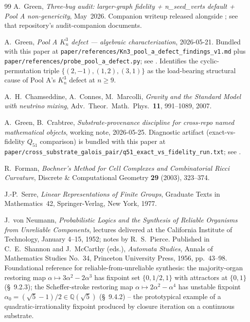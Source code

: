 \documentclass[12pt,a4paper]{article}
\theoremstyle{definition}
\theoremstyle{remark}
\newcommand{\bQ}{\mathbb{Q}}                %
\begin{document}
\begin{thebibliography}{99}
 A.~Green,
\emph{Three-bug audit: larger-graph fidelity + n\_seed\_verts default
+ Pool A non-genericity}, May~2026.
Companion writeup released alongside \cite{CFS2026}; see that
repository's audit-companion documents.

 A.~Green,
\emph{Pool A $K_n^3$ defect --- algebraic characterization},
2026-05-21.
Bundled with this paper at
\texttt{paper/references/Kn3\_pool\_a\_defect\_findings\_v1.md}
plus
\texttt{paper/references/probe\_pool\_a\_defect.py};
see \cite{paper-source}.
Identifies the cyclic-permutation triple
$\{(2,-1), (1,2), (3,1)\}$ as the load-bearing structural cause of
Pool A's $K_n^3$ defect at $n \ge 9$.

 A.~H.~Chamseddine, A.~Connes, M.~Marcolli,
\emph{Gravity and the Standard Model with neutrino mixing},
Adv.\ Theor.\ Math.\ Phys.\ \textbf{11}, 991--1089, 2007.

 A.~Green, B.~Crabtree,
\emph{Substrate-provenance discipline for cross-repo named
mathematical objects}, working note, 2026-05-25.
Diagnostic artifact (exact-vs-fidelity $Q_{51}$ comparison) is
bundled with this paper at
\texttt{paper/cross\_substrate\_galois\_pair/q51\_exact\_vs\_fidelity\_run.txt};
see \cite{paper-source}.

 R.~Forman,
\emph{Bochner's Method for Cell Complexes and Combinatorial Ricci
Curvature}, Discrete \& Computational Geometry \textbf{29} (2003),
323--374.

 J.-P.~Serre,
\emph{Linear Representations of Finite Groups}, Graduate Texts in
Mathematics~42, Springer-Verlag, New York, 1977.

 J.~von Neumann,
\emph{Probabilistic Logics and the Synthesis of Reliable Organisms
from Unreliable Components}, lectures delivered at the California
Institute of Technology, January 4--15, 1952; notes by R.~S.~Pierce.
Published in C.~E.~Shannon and J.~McCarthy (eds.),
\emph{Automata Studies}, Annals of Mathematics Studies No.~34,
Princeton University Press, 1956, pp.~43--98.
Foundational reference for reliable-from-unreliable synthesis: the
majority-organ restoring map $\alpha\mapsto 3\alpha^2-2\alpha^3$ has
fixpoint set $\{0,1/2,1\}$ with attractors at $\{0,1\}$ (\S~9.2.3);
the Scheffer-stroke restoring map $\alpha\mapsto 2\alpha^2-\alpha^4$
has unstable fixpoint $\alpha_0=(\sqrt 5-1)/2\in\bQ(\sqrt 5)$
(\S~9.4.2) -- the prototypical example of a quadratic-irrationality
fixpoint produced by closure iteration on a continuous substrate.

\end{thebibliography}
\end{document}
